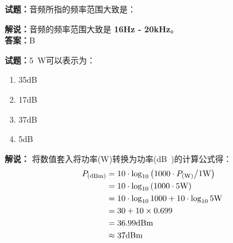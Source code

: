 \documentclass{ctexbook}
\begin{document}
\bigskip

\noindent\textbf{试题：}音频所指的频率范围大致是：


\noindent\textbf{解说：}音频的频率范围大致是 \textbf{\num{16}\unit{\hertz} - \num{20}\unit{\kHz}}。\\\noindent\textbf{答案：}B

\bigskip

\noindent\textbf{试题：}\qty{5}{\watt}可以表示为：

\begin{enumerate}[leftmargin=3em]
  \item \num{35}\unit[qualifier-mode=combine]{\deci\bel{}}
  \item \num{17}\unit[qualifier-mode=combine]{\deci\bel{}}
  \item \num{37}\unit[qualifier-mode=combine]{\deci\bel{}}
  \item \num{5}\unit[qualifier-mode=combine]{\deci\bel{}}
\end{enumerate}

\noindent\textbf{解说：}
将数值套入将功率(\unit{\watt})转换为功率(\unit[qualifier-mode=combine]{\deci\bel{}})的计算公式得：
\begin{equation*}
  \begin{aligned}
    P_{(\unit[qualifier-mode=combine]{\deci\bel\of{m}})} & = 10 \cdot \log_{10} \left( 1000 \cdot P_{(\unit{\watt})} \middle/ 1 \unit{\watt} \right) \\
                                                         & = 10 \cdot \log_{10} \left( 1000 \cdot 5 \unit{\watt} \right)                             \\
                                                         & = 10 \cdot \log_{10} 1000 + 10 \cdot \log_{10} 5 \unit{\watt}                             \\
                                                         & = 30 + 10 \times 0.699                                                                    \\
                                                         & = 36.99 \unit[qualifier-mode=combine]{\deci\bel\of{m}}                                    \\
                                                         & \approx 37     \unit[qualifier-mode=combine]{\deci\bel\of{m}}
  \end{aligned}
\end{equation*}
\end{document}
